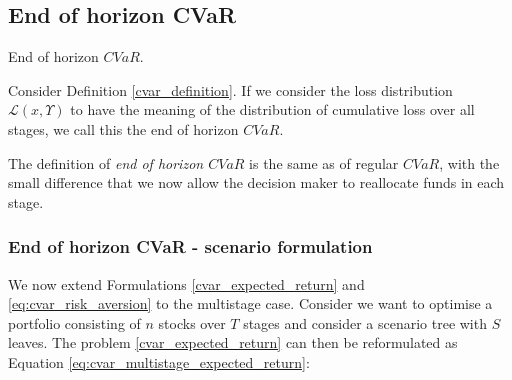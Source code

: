 \subsection{End of horizon CVaR}

\begin{defn}{End of horizon $CVaR$.}

Consider Definition \ref{cvar_definition}. If we consider the loss distribution $\mathcal{L}(x,\Upsilon)$ to have the meaning of the distribution of cumulative loss over all stages, we call this the end of horizon $CVaR$.
\end{defn}
The definition of \textit{end of horizon $CVaR$} is the same as of regular $CVaR$, with the small difference that we now allow the decision maker to reallocate funds in each stage. 

\subsubsection{End of horizon CVaR - scenario formulation}
We now extend Formulations \ref{cvar_expected_return} and \ref{eq:cvar_risk_aversion} to the multistage case. Consider we want to optimise a portfolio consisting of $n$ stocks over $T$ stages and consider a scenario tree with $S$ leaves. The problem \ref{cvar_expected_return} can then be reformulated as Equation \ref{eq:cvar_multistage_expected_return}:

